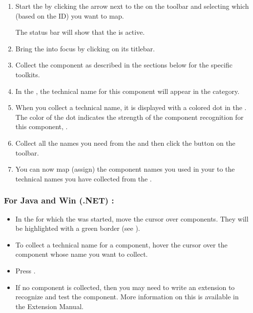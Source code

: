 \begin{enumerate}
\item Start the \gdomm{} by clicking the arrow next to the on the toolbar and selecting which \gdaut{} (based on the \gdaut{} ID) you want to map. 


The status bar will show that the \gdomm{} is active. 
\item Bring the \gdaut{} into focus by clicking on its titlebar. 
\item Collect the component as described in the sections below for the specific toolkits.
 \item In the \gdomeditor{}, the technical name for this component will appear in the  category. 
\item When you collect a technical name, it is displayed with a colored dot in the \gdomeditor{}. The color of the dot indicates the strength of the component recognition for this component,  .
\item Collect all the names you need from the \gdaut{} and then click the  button on the toolbar. 
\item You can now map (assign) the component names you used in your \gdcases{} to the technical names you have collected from the \gdaut{} .
\end{enumerate}

\subsubsection{For Java and Win (.NET) \gdauts{}:}
\begin{itemize}
\item In the \gdaut{} for which the \gdomm{} was started, move the cursor over components. They will be highlighted with a green border (see ). 
\item To collect a technical name for a component, hover the cursor over the component whose name you want to collect. 
\item Press .
\item If no component is collected, then you may need to write an extension to recognize and test the component. More information on this is available in the Extension Manual.
\end{itemize}

